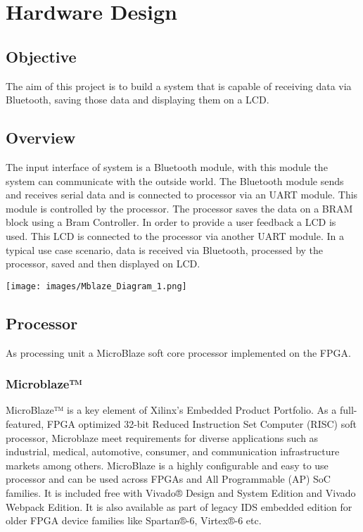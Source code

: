 
\chapter{Hardware Design}

\section{Objective}
The aim of this project is to build a system that is capable of receiving data via Bluetooth, saving those data  and displaying them on a LCD.


\section{Overview}

The input interface of system is a Bluetooth module, with this module the system can communicate with the outside world. The Bluetooth module sends and receives serial data and is connected to processor via an UART module. This module is controlled by the processor. The processor saves the data on a BRAM block using a Bram Controller. In order to provide a user feedback a LCD is used. This LCD is connected to the processor via another UART module. In a typical use case scenario, data is received via Bluetooth, processed by the processor, saved and then displayed on LCD. 

\texttt{[image: images/Mblaze\_Diagram\_1.png]}


\section{Processor}
As processing unit a MicroBlaze soft core processor implemented on the FPGA.
\subsection{Microblaze™}
MicroBlaze™ is a key element of Xilinx’s Embedded Product Portfolio. As a full-featured, FPGA optimized 32-bit Reduced Instruction Set Computer (RISC) soft processor, Microblaze meet requirements for diverse applications such as industrial, medical, automotive, consumer, and communication infrastructure markets among others. MicroBlaze is a highly configurable and easy to use processor and can be used across FPGAs and All Programmable (AP) SoC families. It is included free with Vivado® Design and System Edition and Vivado Webpack Edition. It is also available as part of legacy IDS embedded edition for older FPGA device families like Spartan®-6, Virtex®-6 etc.

